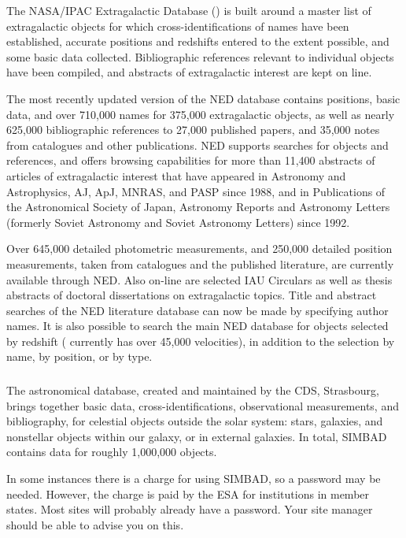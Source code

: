 The NASA/IPAC Extragalactic Database ({\NEDref}) is built around a master list of
extragalactic objects for which cross-identifications of names have been
established, accurate positions and redshifts entered to the extent possible,
and some basic data collected. Bibliographic references relevant to
individual objects have been compiled, and abstracts of extragalactic
interest are kept on line. 

The most recently updated version of the NED database contains positions,
basic data, and over 710,000 names for 375,000 extragalactic objects, as well
as nearly 625,000 bibliographic references to 27,000 published papers, and
35,000 notes from catalogues and other publications. NED supports searches for
objects and references, and offers browsing capabilities for more than 11,400
abstracts of articles of extragalactic interest that have appeared in
Astronomy and Astrophysics, AJ, ApJ, MNRAS, and PASP since 1988, and in
Publications of the Astronomical Society of Japan, Astronomy Reports and
Astronomy Letters (formerly Soviet Astronomy and Soviet Astronomy Letters)
since 1992. 

Over 645,000 detailed photometric measurements, and 250,000 detailed position
measurements, taken from catalogues and the published literature, are currently
available through NED. Also on-line are selected IAU Circulars as well as
thesis abstracts of doctoral dissertations on extragalactic topics. Title and
abstract searches of the NED literature database can now be made by
specifying author names. It is also possible to search the main NED database
for objects selected by redshift ({\NEDref} currently has over 45,000 velocities),
in addition to the selection by name, by position, or by type.

\subsubsection{{\SIMBADref}} 
\label{sec:simbad}
 
The {\SIMBADref} astronomical database, created and maintained by the CDS,
Strasbourg, brings together basic data, cross-identifications, observational
measurements, and bibliography, for celestial objects outside the solar
system: stars, galaxies, and nonstellar objects within our galaxy, or in
external galaxies. In total, SIMBAD contains data for roughly
1,000,000 objects. 

In some instances there is a charge for using SIMBAD, so a password may be needed. 
However, the charge is paid by the ESA for institutions in member states. Most 
{\STARLINKref} sites will probably already have a password. Your site manager 
should be able to advise you on this.

